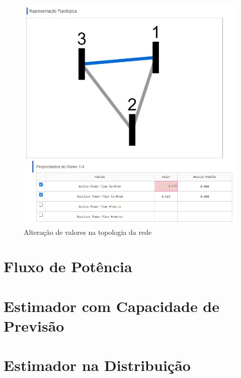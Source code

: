 \documentclass{article}
\begin{document}
\begin{figure}[H]
    \centering
    \includegraphics[scale = .7]{Imagens/Alteração_pelo_Grafo.PNG}
    \caption{Alteração de valores na topologia da rede}
    \label{fig:alt_top}
\end{figure}


\section{Fluxo de Potência}

\section{Estimador com Capacidade de Previsão}

\section{Estimador na Distribuição}
\end{document}
